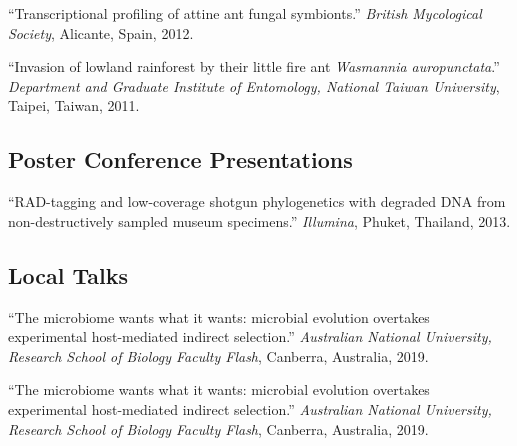 \documentclass[11pt]{article}
\def\printdate#1{\xprintdate#1-}
\def\xprintdate#1-#2-#3-{#1}
\begin{document}
\ind ``Transcriptional profiling of attine ant fungal
symbionts.'' \emph{British Mycological Society}, Alicante,
Spain, \printdate{2012-00-00}.


\ind ``Invasion of lowland rainforest by their little fire ant
\textit{Wasmannia auropunctata}.'' \emph{Department and Graduate
Institute of Entomology, National Taiwan University}, Taipei,
Taiwan, \printdate{2011-00-00}.







\subsection{Poster Conference Presentations}
































\ind ``RAD-tagging and low-coverage shotgun phylogenetics with degraded
DNA from non-destructively sampled museum
specimens.'' \emph{Illumina}, Phuket, Thailand, \printdate{2013-00-00}.















\subsection{Local Talks}


\ind ``The microbiome wants what it wants: microbial evolution overtakes
experimental host-mediated indirect selection.'' \emph{Australian
National University, Research School of Biology Faculty
Flash}, Canberra, Australia, \printdate{2019-06-26}.


\ind ``The microbiome wants what it wants: microbial evolution overtakes
experimental host-mediated indirect selection.'' \emph{Australian
National University, Research School of Biology Faculty
Flash}, Canberra, Australia, \printdate{2019-06-26}.
\end{document}
